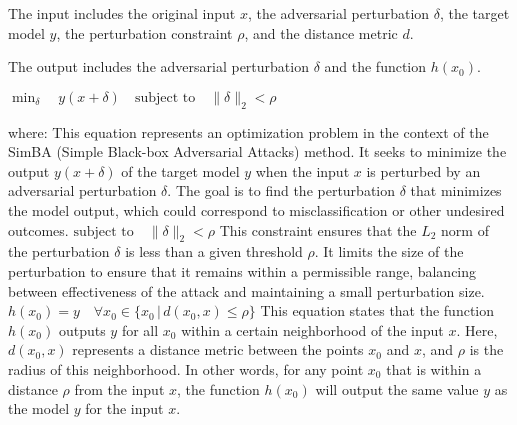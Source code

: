 The input includes the original input $x$, the adversarial perturbation $\delta$, the target model $y$, the perturbation constraint $\rho$, and the distance metric $d$.

The output includes the adversarial perturbation $\delta$ and the function $h(x_0)$.

$\min_{\delta} \quad y(x + \delta) \quad \text{subject to} \quad \| \delta \|_2 < \rho$

where:
This equation represents an optimization problem in the context of the SimBA (Simple Black-box Adversarial Attacks) method. It seeks to minimize the output $y(x + \delta)$ of the target model $y$ when the input $x$ is perturbed by an adversarial perturbation $\delta$. The goal is to find the perturbation $\delta$ that minimizes the model output, which could correspond to misclassification or other undesired outcomes.
$\text{subject to} \quad \| \delta \|_2 < \rho$
This constraint ensures that the $L_2$ norm of the perturbation $\delta$ is less than a given threshold $\rho$. It limits the size of the perturbation to ensure that it remains within a permissible range, balancing between effectiveness of the attack and maintaining a small perturbation size.
$h(x_0) = y \quad \forall x_0 \in \{ x_0 \, | \, d(x_0, x) \leq \rho \}$
This equation states that the function $h(x_0)$ outputs $y$ for all $x_0$ within a certain neighborhood of the input $x$. Here, $d(x_0, x)$ represents a distance metric between the points $x_0$ and $x$, and $\rho$ is the radius of this neighborhood. In other words, for any point $x_0$ that is within a distance $\rho$ from the input $x$, the function $h(x_0)$ will output the same value $y$ as the model $y$ for the input $x$.
